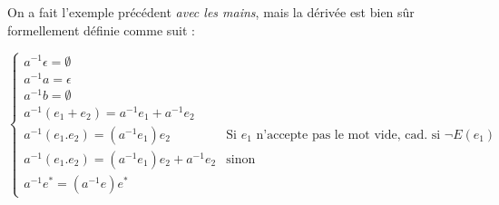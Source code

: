 On a fait l'exemple précédent \textit{avec les mains}, mais la dérivée est bien sûr formellement définie comme suit : 

\[
\begin{cases}
a^{-1}\epsilon = \emptyset \\
a^{-1}a = \epsilon \\
a^{-1}b = \emptyset \\
a^{-1}(e_1+e_2) = a^{-1}e_1 + a^{-1}e_2 \\
a^{-1}(e_1.e_2) = (a^{-1}e_1)e_2 & \text{Si } e_1 \text{ n'accepte pas le mot vide, cad. si }\neg E(e_1) \\
a^{-1}(e_1.e_2) = (a^{-1}e_1)e_2 + a^{-1}e_2 & \text{sinon}  \\
a^{-1}e^* = (a^{-1}e)e^*
\end{cases}
\]

